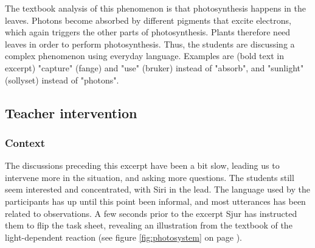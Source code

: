  The textbook analysis of this phenomenon is that photosynthesis happens in the leaves. Photons become absorbed by different pigments that excite electrons, which again triggers the other parts of photosynthesis. Plants therefore need leaves in order to perform photosynthesis. Thus, the students are discussing a complex phenomenon using everyday language. Examples are (bold text in excerpt) "capture" (fange) and "use" (bruker) instead of "absorb", and "sunlight" (sollyset) instead of "photons". 

\subsection{Teacher intervention}

\subsubsection*{Context}
The discussions preceding this excerpt have been a bit slow, leading us to intervene more in the situation, and asking more questions. The students still seem interested and concentrated, with Siri in the lead. The language used by the participants has up until this point been informal, and most utterances has been related to observations. A few seconds prior to the excerpt Sjur has instructed them to flip the task sheet, revealing an illustration from the textbook of the light-dependent reaction (see figure \ref{fig:photosystem} on page \pageref{fig:photosystem}).

